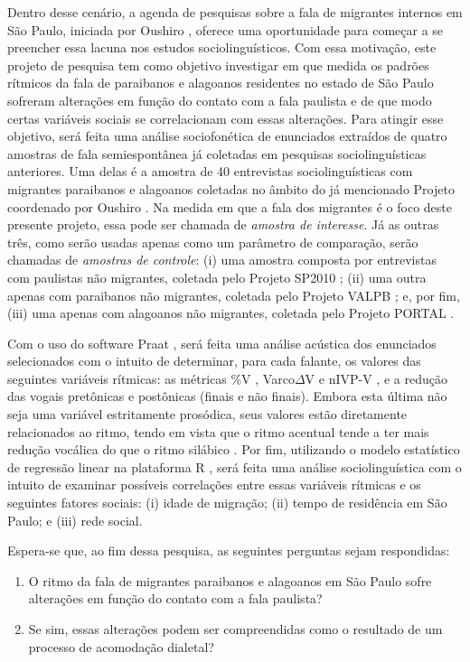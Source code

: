 \documentclass[a4paper, 12pt, article, oneside, brazil,leqno]{memoir}
\begin{document}
Dentro desse cenário, a agenda de pesquisas sobre a fala de migrantes internos em São Paulo, iniciada por Oushiro \citeyear{oushiro2018}, oferece uma oportunidade para começar a se preencher essa lacuna nos estudos sociolinguísticos. Com essa motivação, este projeto de pesquisa tem como objetivo investigar em que medida os padrões rítmicos da fala de paraibanos e alagoanos residentes no estado de São Paulo sofreram alterações em função do contato com a fala paulista e de que modo certas variáveis sociais se correlacionam com essas alterações. Para atingir esse objetivo, será feita uma análise sociofonética de enunciados extraídos de quatro amostras de fala semiespontânea já coletadas em pesquisas sociolinguísticas anteriores. Uma delas é a amostra de 40 entrevistas sociolinguísticas com migrantes paraibanos e alagoanos coletadas no âmbito do já mencionado Projeto coordenado por Oushiro \citeyear{oushiro2018}. Na medida em que a fala dos migrantes é o foco deste presente projeto, essa pode ser chamada de \emph{amostra de interesse}. Já as outras três, como serão usadas apenas como um parâmetro de comparação, serão chamadas de \emph{amostras de controle}: (i) uma amostra composta por entrevistas com paulistas não migrantes, coletada pelo Projeto SP2010 \cite{mendes2012}; (ii) uma outra apenas com paraibanos não migrantes, coletada pelo Projeto VALPB \cite{hora1993}; e, por fim, (iii) uma apenas com alagoanos não migrantes, coletada pelo Projeto PORTAL \cite{oliveira2017}.

Com o uso do software Praat \cite{boersma2019}, será feita uma análise acústica dos enunciados selecionados com o intuito de determinar, para cada falante, os valores das seguintes variáveis rítmicas: as métricas \%V \cite{ramus1999}, Varco$\Delta$V \cite{white2007a} e nIVP-V \cite{grabe2002}, e a redução das vogais pretônicas e postônicas (finais e não finais). Embora esta última não seja uma variável estritamente prosódica, seus valores estão diretamente relacionados ao ritmo, tendo em vista que o ritmo acentual tende a ter mais redução vocálica do que o ritmo silábico \cite{fuchs2016}. Por fim, utilizando o modelo estatístico de regressão linear na plataforma R \cite{rcoreteam2019}, será feita uma análise sociolinguística com o intuito de examinar possíveis correlações entre essas variáveis rítmicas e os seguintes fatores sociais: (i) idade de migração; (ii) tempo de residência em São Paulo; e (iii) rede social.

Espera-se que, ao fim dessa pesquisa, as seguintes perguntas sejam respondidas:
      \begin{enumerate}
            \item O ritmo da fala de migrantes paraibanos e alagoanos em São Paulo sofre alterações em função do contato com a fala paulista?
            \item Se sim, essas alterações podem ser compreendidas como o resultado de um processo de acomodação dialetal?
      \end{enumerate}
\end{document}
